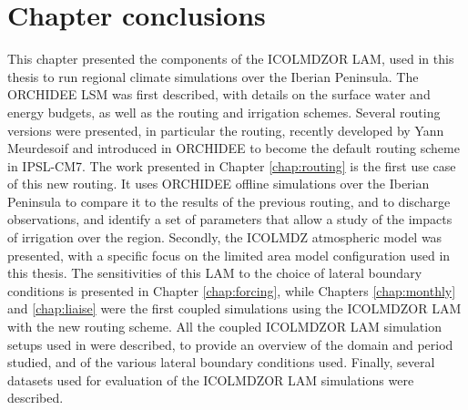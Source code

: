 \section{Chapter conclusions}
This chapter presented the components of the ICOLMDZOR LAM, used in this thesis to run regional climate simulations over the Iberian Peninsula.
The ORCHIDEE LSM was first described, with details on the surface water and energy budgets, as well as the routing and irrigation schemes. 
Several routing versions were presented, in particular the \native routing, recently developed by Yann Meurdesoif and introduced in ORCHIDEE to become the default routing scheme in IPSL-CM7. The work presented in Chapter \ref{chap:routing} is the first use case of this new routing. It uses ORCHIDEE offline simulations over the Iberian Peninsula to compare it to the results of the previous routing, and to discharge observations, and identify a set of parameters that allow a study of the impacts of irrigation over the region.
Secondly, the ICOLMDZ atmospheric model was presented, with a specific focus on the limited area model configuration used in this thesis. 
The sensitivities of this LAM to the choice of lateral boundary conditions is presented in Chapter \ref{chap:forcing}, while Chapters \ref{chap:monthly} and \ref{chap:liaise} were the first coupled simulations using the ICOLMDZOR LAM with the new routing scheme. 
All the coupled ICOLMDZOR LAM simulation setups used in \atmchapters were described, to provide an overview of the domain and period studied, and of the various lateral boundary conditions used. 
Finally, several datasets used for evaluation of the ICOLMDZOR LAM simulations were described.

